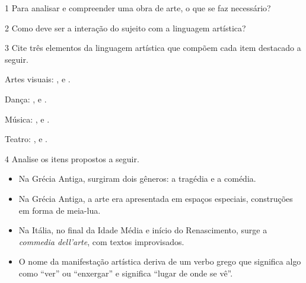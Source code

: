 
\num{1}  Para analisar e compreender uma obra de arte, o que se faz necessário?


\num{2} Como deve ser a interação do sujeito com a linguagem artística?


\num{3}  Cite três elementos da linguagem artística que compõem cada item destacado a seguir.

\begin{escolha}
\item
  Artes visuais: \preencher, \preencher e \preencher.


\item
  Dança: \preencher, \preencher e \preencher.


\item
  Música: \preencher, \preencher e \preencher.


\item
  Teatro: \preencher, \preencher e \preencher.

\end{escolha}

\num{4} Analise os itens propostos a seguir.

\begin{itemize}
  \item Na Grécia Antiga, surgiram dois gêneros: a tragédia e a comédia.
  \item Na Grécia Antiga, a arte era apresentada em espaços especiais,
construções em forma de meia-lua.
  \item Na Itália, no final da Idade Média e início do Renascimento, surge a
\textit{commedia dell'arte}, com textos improvisados.
  \item O nome da manifestação artística deriva de um verbo grego que significa algo como ``ver'' ou ``enxergar'' e significa ``lugar de onde se vê''.
\end{itemize}

